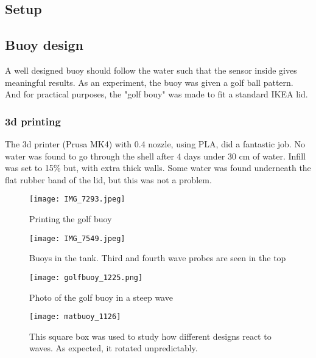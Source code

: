 \subsection{Setup}

\subsection{Buoy design}
A well designed buoy should follow the water such that the sensor inside gives meaningful results. As an experiment, the buoy was given a golf ball pattern. And for practical purposes, the "golf bouy" was made to fit a standard IKEA lid.

\subsubsection{3d printing}
The 3d printer (Prusa MK4) with 0.4 nozzle, using PLA, did a fantastic job. No water was found to go through the shell after 4 days under 30 cm of water.  Infill was set to 15\% but, with extra thick walls. Some water was found underneath the flat rubber band of the lid, but this was not a problem.


\begin{figure*}[h!]
    \centering
    \texttt{[image: IMG\_7293.jpeg]}
    \caption{Printing the golf buoy}
    \label{fig:coord}
\end{figure*}

\begin{figure*}[ht]
    \centering
    \texttt{[image: IMG\_7549.jpeg]}
    \caption{Buoys in the tank. Third and fourth wave probes are seen in the top}
    \label{fig:buoys}
\end{figure*}

\begin{figure*}[h]
    \centering
    \texttt{[image: golfbuoy\_1225.png]}
    \caption{Photo of the golf buoy in a steep wave}
    \label{fig:golfbuoy_1225}
\end{figure*}

\begin{figure*}[h]
    \centering
    \texttt{[image: matbuoy\_1126]}%
    \caption{This square box was used to study how different designs react to waves. As expected, it rotated unpredictably.}
    \label{fig:matbuoy}
\end{figure*}




